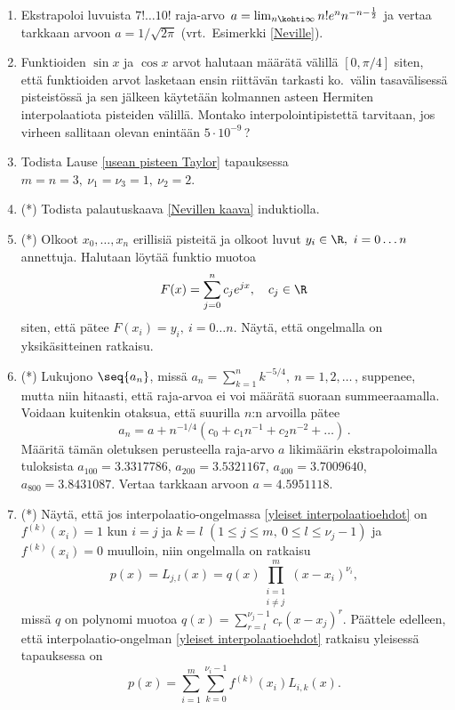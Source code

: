 \begin{enumerate}
\item
Ekstrapoloi luvuista $7! \ldots 10!$ raja-arvo $\,a=\lim_{n\kohti\infty} n!e^nn^{-n-\frac{1}{2}}$
ja vertaa tarkkaan arvoon $a=1/\sqrt{2\pi}$ (vrt.\ Esimerkki \ref{Neville}).

\item
Funktioiden $\sin x$ ja $\cos x$ arvot halutaan määrätä välillä $[0,\pi/4]$ siten, että
funktioiden arvot lasketaan ensin riittävän tarkasti ko.\ välin tasavälisessä pisteistössä ja
sen jälkeen käytetään kolmannen asteen Hermiten interpolaatiota pisteiden välillä. Montako
interpolointipistettä tarvitaan, jos virheen sallitaan olevan enintään $5 \cdot 10^{-9}$\,?

\item 
Todista Lause \ref{usean pisteen Taylor} tapauksessa $m=n=3,\ \nu_1=\nu_3=1,\ \nu_2=2$.

\item (*) \label{H-VIII-7: Nevillen kaava}
Todista palautuskaava \eqref{Nevillen kaava} induktiolla.

\item (*)
Olkoot $x_0, \ldots, x_n$ erillisiä pisteitä ja olkoot luvut $y_i\in\R,\ i= 0 \ldots n$ 
annettuja. Halutaan löytää funktio muotoa
\[
F(x)=\sum_{j=0}^n c_j e^{jx}, \quad c_j\in\R
\]
siten, että pätee $F(x_i)=y_i,\ i=0 \ldots n$. Näytä, että ongelmalla on yksikäsitteinen
ratkaisu.

\item (*)
Lukujono $\seq{a_n}$, missä $a_n = \sum_{k=1}^n k^{-5/4},\ n=1,2, \ldots\,$, suppenee, mutta
niin hitaasti, että raja-arvoa ei voi määrätä suoraan summeeraamalla. Voidaan kuitenkin
otaksua, että suurilla $n$:n arvoilla pätee
\[
a_n=a+n^{-1/4}(c_0+c_1n^{-1}+c_2n^{-2}+ \ldots)\,. 
\]
Määritä tämän oletuksen perusteella raja-arvo $a$ likimäärin ekstrapoloimalla tuloksista
$a_{100}=3.3317786$, $a_{200}=3.5321167$, $a_{400}=3.7009640$, $a_{800}=3.8431087$. Vertaa
tarkkaan arvoon $a=4.5951118$.

\item (*)  \label{H-VIII-7: yleinen interpolaatio-ongelma}
Näytä, että jos interpolaatio-ongelmassa \eqref{yleiset interpolaatioehdot} on
$f^{(k)}(x_i)=1$ kun $i=j$ ja $k=l$ $(1 \le j \le m,\ 0 \le l \le \nu_j-1)$ ja
$f^{(k)}(x_i)=0$ muulloin, niin ongelmalla on ratkaisu
\[
p(x) = L_{j,l}(x) = q(x) \prod_{\substack{i=1 \\ i \neq j}}^m (x-x_i)^{\nu_i},
\]
missä $q$ on polynomi muotoa $q(x)=\sum_{r=l}^{\nu_j-1} c_r (x-x_j)^r$. Päättele edelleen, että
interpolaatio-ongelman \eqref{yleiset interpolaatioehdot} ratkaisu yleisessä tapauksessa on
\[
p(x) = \sum_{i=1}^m \sum_{k=0}^{\nu_i-1} f^{(k)}(x_i) L_{i,k}(x).
\] 

\end{enumerate}
